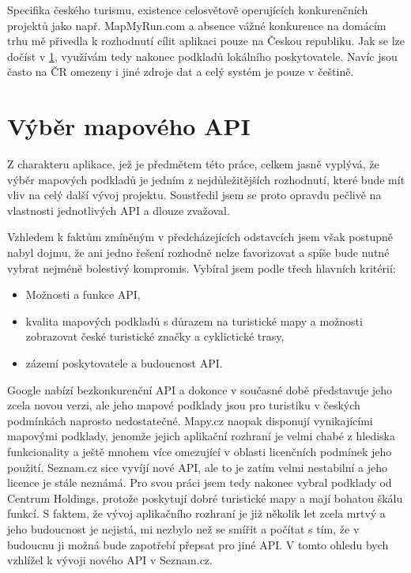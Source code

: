 Specifika českého turismu, existence celosvětově operujících
konkurenčních projektů jako např. MapMyRun.com a absence vážné
konkurence na domácím trhu mě přivedla k rozhodnutí cílit aplikaci
pouze na Českou republiku. Jak se lze dočíst v \ref{vybranamapa},
využívám tedy nakonec podkladů lokálního poskytovatele. Navíc jsou
často na ČR omezeny i jiné zdroje dat a celý systém je pouze v
češtině.

\section{Výběr mapového API}\label{vybranamapa}
Z charakteru aplikace, jež je předmětem této práce, celkem jasně
vyplývá, že výběr mapových podkladů je jedním z nej\-důležitějších
rozhodnutí, které bude mít vliv na celý další vývoj projektu.
Soustředil jsem se proto opravdu pečlivě na vlastnosti
jednotlivých API a dlouze zvažoval.

Vzhledem k faktům zmíněným v předcházejících odstavcích jsem však
postupně nabyl dojmu, že ani jedno řešení rozhodně nelze favorizovat a
spíše bude nutné vybrat nej\-méně bolestivý kompromis. Vybíral jsem
podle třech hlavních kritérií:
\begin{itemize}
	\item Možnosti a funkce API,
	\item kvalita mapových podkladů s důrazem na turistické
	mapy a možnosti zobrazovat české turistické značky a cyklictické
	trasy,
	\item zázemí poskytovatele a budoucnost API.
\end{itemize}

Google nabízí bezkonkurenční API a dokonce v současné době
představuje jeho zcela novou verzi, ale jeho mapové podklady jsou pro turistiku v
českých podmínkách naprosto nedostatečné. Mapy.cz naopak disponují
vynikajícími mapovými podklady, jenomže jejich aplikační rozhraní je
velmi chabé z hlediska funkcionality a ještě mnohem více omezující v
oblasti licenčních podmínek jeho použití. Seznam.cz sice vyvíjí nové
API, ale to je zatím velmi nestabilní a jeho licence je stále
neznámá. Pro svou práci jsem tedy nakonec vybral podklady od Centrum
Holdings, protože poskytují dobré turistické mapy a mají bohatou
škálu funkcí. S faktem, že vývoj aplikačního rozhraní je již několik
let zcela mrtvý a jeho budoucnost je nejistá, mi nezbylo než se
smířit a počítat s tím, že v budoucnu ji možná bude zapotřebí přepsat
pro jiné API. V tomto ohledu bych vzhlížel k vývoji nového API v Seznam.cz.

